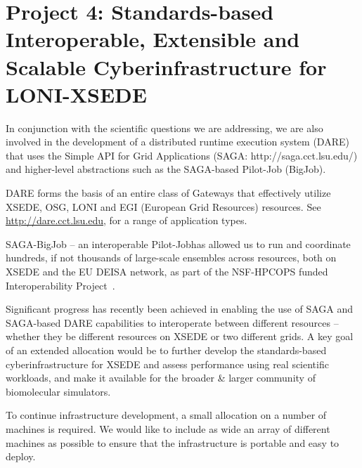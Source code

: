 \documentclass[a4paper,11pt]{article}
\newcommand{\up}{\vspace*{-1em}}
\begin{document}
\section{Project 4: Standards-based Interoperable, Extensible and Scalable Cyberinfrastructure for LONI-XSEDE}

In conjunction with the scientific questions we are addressing, we are also involved in the development of a distributed runtime execution system (DARE) that uses the Simple API for Grid Applications (SAGA: http://saga.cct.lsu.edu/)
and higher-level abstractions such as the SAGA-based Pilot-Job (BigJob).

DARE forms the basis of an entire class of Gateways that effectively utilize XSEDE, OSG, LONI and EGI (European Grid Resources) resources. See \url{http://dare.cct.lsu.edu}, for a range of application types.

SAGA-BigJob -- an interoperable Pilot-Jobhas allowed us to run and coordinate hundreds, if not thousands of large-scale ensembles across resources, both on XSEDE and the EU DEISA network, as part of the NSF-HPCOPS funded Interoperability Project~\cite{tg-vph-interop}.  

Significant progress has recently been achieved in enabling the use of SAGA and SAGA-based DARE capabilities to interoperate between different resources -- whether they be different resources on XSEDE or two different grids.  A key goal of an extended allocation would be to further develop the standards-based cyberinfrastructure for XSEDE and assess performance using real scientific workloads, and make it available for the broader \& larger community of biomolecular simulators.

To continue infrastructure development, a small allocation on a number of machines is required. We would like to include as wide an array of different machines as possible to ensure that the infrastructure is portable and easy to deploy. %

\end{document}
